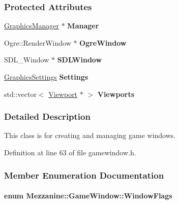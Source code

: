 \subsubsection*{Protected Attributes}
\begin{DoxyCompactItemize}
\item 
\hypertarget{classMezzanine_1_1GameWindow_a4a5a12e111d0dd55eb1244f542961cf6}{
\hyperlink{classMezzanine_1_1GraphicsManager}{GraphicsManager} $\ast$ {\bfseries Manager}}
\label{classMezzanine_1_1GameWindow_a4a5a12e111d0dd55eb1244f542961cf6}

\item 
\hypertarget{classMezzanine_1_1GameWindow_a7b15c357c655b229d21d53a10b158fc3}{
Ogre::RenderWindow $\ast$ {\bfseries OgreWindow}}
\label{classMezzanine_1_1GameWindow_a7b15c357c655b229d21d53a10b158fc3}

\item 
\hypertarget{classMezzanine_1_1GameWindow_a667278373bc7429151159e09b0191a8c}{
SDL\_\-Window $\ast$ {\bfseries SDLWindow}}
\label{classMezzanine_1_1GameWindow_a667278373bc7429151159e09b0191a8c}

\item 
\hypertarget{classMezzanine_1_1GameWindow_aa9356c86569b749ba370118aa5226395}{
\hyperlink{structMezzanine_1_1GraphicsSettings}{GraphicsSettings} {\bfseries Settings}}
\label{classMezzanine_1_1GameWindow_aa9356c86569b749ba370118aa5226395}

\item 
\hypertarget{classMezzanine_1_1GameWindow_a4c88924904cd902d350433cdc1115b54}{
std::vector$<$ \hyperlink{classMezzanine_1_1Viewport}{Viewport} $\ast$ $>$ {\bfseries Viewports}}
\label{classMezzanine_1_1GameWindow_a4c88924904cd902d350433cdc1115b54}

\end{DoxyCompactItemize}


\subsubsection{Detailed Description}
This class is for creating and managing game windows. 

Definition at line 63 of file gamewindow.h.



\subsubsection{Member Enumeration Documentation}
\hypertarget{classMezzanine_1_1GameWindow_ac31ba18e78ad8c6e749019726a0dbe6f}{
\paragraph[{WindowFlags}]{\setlength{\rightskip}{0pt plus 5cm}enum {\bf Mezzanine::GameWindow::WindowFlags}}\hfill}
\label{classMezzanine_1_1GameWindow_ac31ba18e78ad8c6e749019726a0dbe6f}


